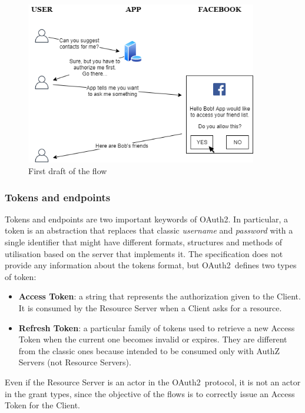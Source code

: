 \documentclass[a4paper,12pt]{article}
\def\oauth{OAuth2\xspace}
\begin{document}
\begin{figure}[ht]
    \centering
    \includegraphics[width=0.9\textwidth]{figures/flow1.png}
    \caption{First draft of the flow}
    \label{fig:flow1}
    \vspace{0.5cm}
\end{figure}

\subsubsection{Tokens and endpoints}
Tokens and endpoints are two important keywords of \oauth. In particular, a token is an abstraction that replaces that classic \textit{username} and \textit{password} with a single identifier that might have different formats, structures and methods of utilisation based on the server that implements it. 
The specification does not provide any information about the tokens format, but \oauth\ defines two types of token:

\begin{itemize}
    \item \textbf{Access Token}: a string that represents the authorization given to the Client. It is consumed by the Resource Server when a Client asks for a resource.

    \item \textbf{Refresh Token}: a particular family of tokens used to retrieve a new Access Token when the current one becomes invalid or expires. They are different from the classic ones because intended to be consumed only with AuthZ Servers (not Resource Servers).
\end{itemize}

Even if the Resource Server is an actor in the \oauth\ protocol, it is not an actor in the grant types, since the objective of the flows is to correctly issue an Access Token for the Client.
\end{document}
